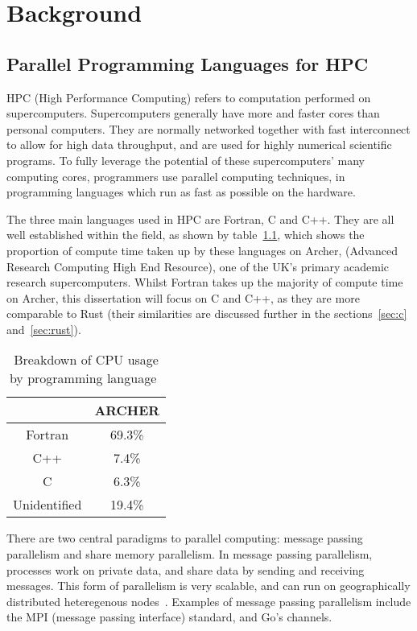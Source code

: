 \chapter{Background}
\section{Parallel Programming Languages for HPC}
HPC (High Performance Computing) refers to computation performed on supercomputers. 
Supercomputers generally have more and faster cores than personal computers. They are normally networked together with fast interconnect to allow for high data throughput, and are used for highly numerical scientific programs.
To fully leverage the potential of these supercomputers' many computing cores, programmers use parallel computing techniques, in programming languages which run as fast as possible on the hardware.

The three main languages used in HPC are Fortran, C and C++. They are all well established within the field, as shown by table~\ref{tab:langs}, which shows the proportion of compute time taken up by these languages on Archer, (Advanced Research Computing High End Resource), one of the UK's primary academic research supercomputers.
Whilst Fortran takes up the majority of compute time on Archer, this dissertation will focus on C and C++, as they are more comparable to Rust (their similarities are discussed further in the sections~\ref{sec:c} and~\ref{sec:rust}).

\begin{table}[h]
  \centering
  \begin{tabular}{|c|c|}
    \hline
    & \textbf{ARCHER} \\
    \hline
    Fortran & 69.3\% \\
    \hline
    C++ & 7.4\% \\
    \hline
    C & 6.3\% \\
    \hline
    Unidentified & 19.4\% \\
    \hline
  \end{tabular}
  \caption{Breakdown of CPU usage by programming language~\cite{Turner2015}}
  \label{tab:langs}
\end{table}

There are two central paradigms to parallel computing: message passing parallelism and share memory parallelism. In message passing parallelism, processes work on private data, and share data by sending and receiving messages. This form of parallelism is very scalable, and can run on geographically distributed heteregenous nodes~\cite{SETI}. Examples of message passing parallelism include the MPI (message passing interface) standard, and Go's channels.


